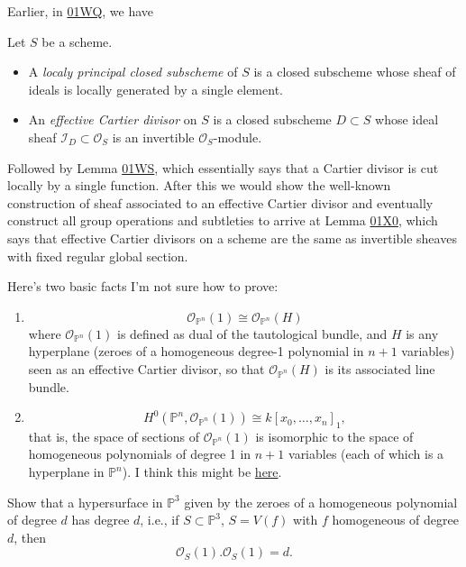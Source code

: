 \documentclass{book}
\begin{document}
\medskip\noindent
Earlier, in
\href{https://stacks.math.columbia.edu/tag/%
01WQ}{01WQ},
we have

\begin{definition}
\label{definition-cartier-divisor}
Let $S$ be a scheme.
\begin{itemize}
\item A {\it localy principal closed
subscheme} of $S$
is a closed subscheme whose sheaf of ideals
is locally generated by a single element.

\item An {\it effective Cartier divisor} on
$S$
is a closed subscheme $D \subset S$ whose
ideal sheaf
$\mathcal{I}_D \subset \mathcal{O}_S$ is an
invertible
$\mathcal{O}_S$-module.
\end{itemize}
\end{definition}

\noindent
Followed by Lemma
\href{https://stacks.math.columbia.edu/tag/%
01WS}{01WS},
which essentially says that a Cartier
divisor is cut locally by a single function.
After this we would show the well-known
construction of sheaf associated to an
effective Cartier divisor
and eventually construct all group operations
and subtleties
to arrive at Lemma
\href{https://stacks.math.columbia.edu/tag/%
01X0}{01X0},
which says that effective Cartier divisors on
a scheme
are the same as invertible sheaves with fixed
regular global section.

\medskip\noindent
Here's two basic facts I'm not sure how to
prove:
\begin{enumerate}
\item
$$
\mathcal{O}_{\mathbb{P}^n}(1)\cong
\mathcal{O}_{\mathbb{P}^n}(H)
$$
where $\mathcal{O}_{\mathbb{P}^n}(1)$ is
defined
as dual of the tautological bundle,
and $H$ is any hyperplane (zeroes of a
homogeneous degree-1 polynomial
in $n+1$ variables) seen as an effective
Cartier divisor,
so that $\mathcal{O}_{\mathbb{P}^n}(H)$ is
its associated line bundle.

\item
$$
H^0(\mathbb{P}^n,\mathcal{O}_{\mathbb{P}^n}
(1))
\cong
k[x_0,…,x_n]_1,
$$
that is, the space of sections of
$\mathcal{O}_{\mathbb{P}^n}(1)$
is isomorphic to the space of homogeneous
polynomials
of degree 1 in $n+1$ variables
(each of which is a hyperplane in
$\mathbb{P}^n$).
I think this might be
\href{https://www.youtube.com/live/%
bXhgeRZMu8M?si=5BPdnECUREsCUwpV&t=4601}{
here}.
\end{enumerate}

\begin{exercise}
\label{exercise-degree-d-surface}
Show that a hypersurface in $\mathbb{P}^3$
given by the zeroes of a homogeneous
polynomial
of degree $d$ has degree $d$,
i.e., if $S \subset \mathbb{P}^3$, $S=V(f)$
with
$f$ homogeneous of degree $d$,
then
 $$
\mathcal{O}_S(1).\mathcal{O}_S(1)=d.
$$
\end{exercise}
\end{document}
